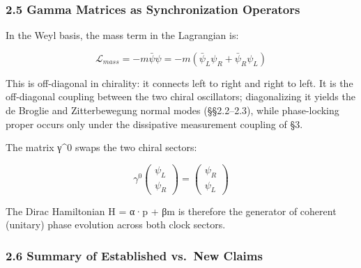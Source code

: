 \documentclass[
]{article}
\begin{document}
\subsubsection{2.5 Gamma Matrices as Synchronization
Operators}\label{gamma-matrices-as-synchronization-operators}

In the Weyl basis, the mass term in the Lagrangian is:

\[\mathcal{L}_{mass} = -m\bar{\psi}\psi = -m(\bar{\psi}_L\psi_R + \bar{\psi}_R\psi_L)\]

This is off-diagonal in chirality: it connects left to right and right
to left. It is the off-diagonal coupling between the two chiral
oscillators; diagonalizing it yields the de Broglie and Zitterbewegung
normal modes (§§2.2--2.3), while phase-locking proper occurs only under
the dissipative measurement coupling of §3.

The matrix γ\^{}0 swaps the two chiral sectors:

\[\gamma^0 \begin{pmatrix} \psi_L \\ \psi_R \end{pmatrix} = \begin{pmatrix} \psi_R \\ \psi_L \end{pmatrix}\]

The Dirac Hamiltonian H = α·p + βm is therefore the generator of
coherent (unitary) phase evolution across both clock sectors.

\subsubsection{2.6 Summary of Established vs.~New
Claims}\label{summary-of-established-vs.-new-claims}
\end{document}
